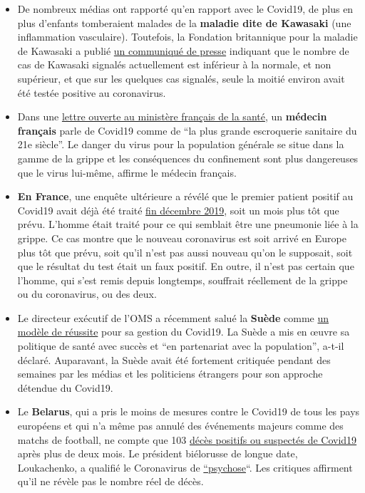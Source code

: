 \begin{itemize}
\tightlist
\item
  De nombreux médias ont rapporté qu'en rapport avec le Covid19, de plus
  en plus d'enfants tomberaient malades de la \textbf{maladie dite de
  Kawasaki} (une inflammation vasculaire). Toutefois, la Fondation
  britannique pour la maladie de Kawasaki a publié
  \href{https://www.societi.org.uk/kawasaki-disease-and-covid-19/}{un
  communiqué de presse} indiquant que le nombre de cas de Kawasaki
  signalés actuellement est inférieur à la normale, et non supérieur, et
  que sur les quelques cas signalés, seule la moitié environ avait été
  testée positive au coronavirus.
\item
  Dans une
  \href{https://covidinfos.net/covid19/la-lettre-dun-praticien-hospitalier-adressee-au-ministere-de-la-sante-denonce-une-arnaque-sanitaire/604/}{lettre
  ouverte au ministère français de la santé}, un \textbf{médecin
  français} parle de Covid19 comme de ``la plus grande escroquerie
  sanitaire du 21e siècle''. Le danger du virus pour la population
  générale se situe dans la gamme de la grippe et les conséquences du
  confinement sont plus dangereuses que le virus lui-même, affirme le
  médecin français.
\item
  \textbf{En France}, une enquête ultérieure a révélé que le premier
  patient positif au Covid19 avait déjà été traité
  \href{https://www.reuters.com/article/us-health-coronavirus-france-retests/frances-early-covid-19-case-may-hold-clues-to-pandemics-start-idUSKBN22H15R}{fin
  décembre 2019}, soit un mois plus tôt que prévu. L'homme était traité
  pour ce qui semblait être une pneumonie liée à la grippe. Ce cas
  montre que le nouveau coronavirus est soit arrivé en Europe plus tôt
  que prévu, soit qu'il n'est pas aussi nouveau qu'on le supposait, soit
  que le résultat du test était un faux positif. En outre, il n'est pas
  certain que l'homme, qui s'est remis depuis longtemps, souffrait
  réellement de la grippe ou du coronavirus, ou des deux.
\item
  Le directeur exécutif de l'OMS a récemment salué la \textbf{Suède}
  comme
  \href{https://nypost.com/2020/04/29/who-lauds-sweden-as-model-for-resisting-coronavirus-lockdown/}{un
  modèle de réussite} pour sa gestion du Covid19. La Suède a mis en
  œuvre sa politique de santé avec succès et ``en partenariat avec la
  population'', a-t-il déclaré. Auparavant, la Suède avait été fortement
  critiquée pendant des semaines par les médias et les politiciens
  étrangers pour son approche détendue du Covid19.
\item
  Le \textbf{Belarus}, qui a pris le moins de mesures contre le Covid19
  de tous les pays européens et qui n'a même pas annulé des événements
  majeurs comme des matchs de football, ne compte que 103
  \href{https://en.wikipedia.org/wiki/COVID-19_pandemic_in_Belarus}{décès
  positifs ou suspectés de Covid19} après plus de deux mois. Le
  président biélorusse de longue date, Loukachenko, a qualifié le
  Coronavirus de
  \href{https://www.baltictimes.com/lukashenko__coronavirus_is_psychosis/}{``psychose}``.
  Les critiques affirment qu'il ne révèle pas le nombre réel de décès.
\end{itemize}

